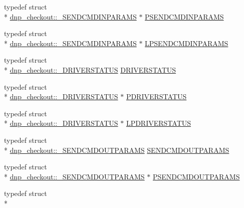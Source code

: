 \begin{DoxyCompactItemize}
\item 
typedef struct \\*
\hyperlink{structdnp__checkout_1_1___s_e_n_d_c_m_d_i_n_p_a_r_a_m_s}{dnp\-\_\-checkout\-::\-\_\-\-S\-E\-N\-D\-C\-M\-D\-I\-N\-P\-A\-R\-A\-M\-S} $\ast$ \hyperlink{namespacednp__checkout_a9a258707ab31e1440dc4dda9384d454e}{P\-S\-E\-N\-D\-C\-M\-D\-I\-N\-P\-A\-R\-A\-M\-S}
\item 
typedef struct \\*
\hyperlink{structdnp__checkout_1_1___s_e_n_d_c_m_d_i_n_p_a_r_a_m_s}{dnp\-\_\-checkout\-::\-\_\-\-S\-E\-N\-D\-C\-M\-D\-I\-N\-P\-A\-R\-A\-M\-S} $\ast$ \hyperlink{namespacednp__checkout_a966f16fea4c05f8f375e994016df8fd1}{L\-P\-S\-E\-N\-D\-C\-M\-D\-I\-N\-P\-A\-R\-A\-M\-S}
\item 
typedef struct \\*
\hyperlink{structdnp__checkout_1_1___d_r_i_v_e_r_s_t_a_t_u_s}{dnp\-\_\-checkout\-::\-\_\-\-D\-R\-I\-V\-E\-R\-S\-T\-A\-T\-U\-S} \hyperlink{namespacednp__checkout_a4a8d9b7c57ae5e7d0d88f7a5be282c57}{D\-R\-I\-V\-E\-R\-S\-T\-A\-T\-U\-S}
\item 
typedef struct \\*
\hyperlink{structdnp__checkout_1_1___d_r_i_v_e_r_s_t_a_t_u_s}{dnp\-\_\-checkout\-::\-\_\-\-D\-R\-I\-V\-E\-R\-S\-T\-A\-T\-U\-S} $\ast$ \hyperlink{namespacednp__checkout_a2703dda8b11ae6e8a1bae11614c55447}{P\-D\-R\-I\-V\-E\-R\-S\-T\-A\-T\-U\-S}
\item 
typedef struct \\*
\hyperlink{structdnp__checkout_1_1___d_r_i_v_e_r_s_t_a_t_u_s}{dnp\-\_\-checkout\-::\-\_\-\-D\-R\-I\-V\-E\-R\-S\-T\-A\-T\-U\-S} $\ast$ \hyperlink{namespacednp__checkout_a3a036c4c0b955f12056ccd47706cba9f}{L\-P\-D\-R\-I\-V\-E\-R\-S\-T\-A\-T\-U\-S}
\item 
typedef struct \\*
\hyperlink{structdnp__checkout_1_1___s_e_n_d_c_m_d_o_u_t_p_a_r_a_m_s}{dnp\-\_\-checkout\-::\-\_\-\-S\-E\-N\-D\-C\-M\-D\-O\-U\-T\-P\-A\-R\-A\-M\-S} \hyperlink{namespacednp__checkout_a2a1bf5b2b11ccf68342f0e163c7d46b5}{S\-E\-N\-D\-C\-M\-D\-O\-U\-T\-P\-A\-R\-A\-M\-S}
\item 
typedef struct \\*
\hyperlink{structdnp__checkout_1_1___s_e_n_d_c_m_d_o_u_t_p_a_r_a_m_s}{dnp\-\_\-checkout\-::\-\_\-\-S\-E\-N\-D\-C\-M\-D\-O\-U\-T\-P\-A\-R\-A\-M\-S} $\ast$ \hyperlink{namespacednp__checkout_acea691d4d3e0a27a9a60cf36e2767942}{P\-S\-E\-N\-D\-C\-M\-D\-O\-U\-T\-P\-A\-R\-A\-M\-S}
\item 
typedef struct \\*

\end{DoxyCompactItemize}
